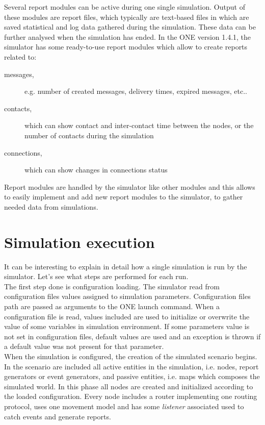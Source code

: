 Several report modules can be active during one single simulation. Output of these modules are report files, which typically are text-based files in which are saved statistical and log data gathered during the simulation. These data can be further analysed when the simulation has ended. In the ONE version 1.4.1, the simulator has some ready-to-use report modules which allow to create reports related to:

\begin{description}
\item[messages,] e.g. number of created messages, delivery times, expired messages, etc..
\item[contacts,] which can show contact and inter-contact time between the nodes, or the number of contacts during the simulation
\item[connections,] which can show changes in connections status
\end{description}

Report modules are handled by the simulator like other modules and this allows to easily implement and add new report modules to the simulator, to gather needed data from simulations.


\section{Simulation execution}
\label{esecuzioneONE}
It can be interesting to explain in detail how a single simulation is run by the simulator. Let's see what steps are performed for each run.
\\

The first step done is configuration loading. The simulator read from configuration files values assigned to simulation parameters. Configuration files path are passed as arguments to the ONE launch command. When a configuration file is read, values included are used to initialize or overwrite the value of some variables in simulation environment. If some parameters value is not set in configuration files, default values are used and an exception is thrown if a default value was not present for that parameter.
\\

When the simulation is configured, the creation of the simulated scenario begins. In the scenario are included all active entities in the simulation, i.e. nodes, report generators or event generators, and passive entities, i.e. maps which composes the simulated world. In this phase all nodes are created and initialized according to the loaded configuration. Every node includes a router implementing one routing protocol, uses one movement model and has some \textit{listener} associated used to catch events and generate reports.
\\

